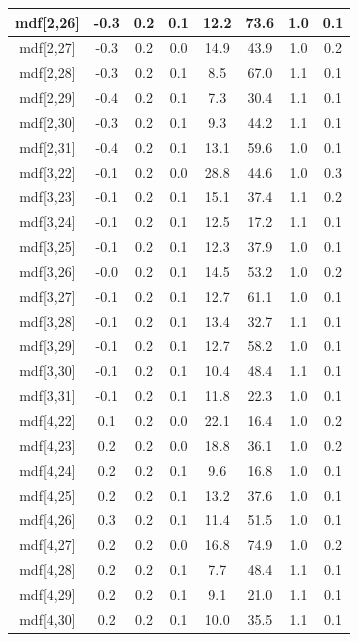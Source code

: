 \begin{longtable}{|c|c|c|c|c|c|c|c|}
\hline
mdf[2,26] & -0.3 & 0.2 & 0.1 & 12.2 & 73.6 & 1.0 & 0.1 \\
\hline
mdf[2,27] & -0.3 & 0.2 & 0.0 & 14.9 & 43.9 & 1.0 & 0.2 \\
\hline
mdf[2,28] & -0.3 & 0.2 & 0.1 & 8.5 & 67.0 & 1.1 & 0.1 \\
\hline
mdf[2,29] & -0.4 & 0.2 & 0.1 & 7.3 & 30.4 & 1.1 & 0.1 \\
\hline
mdf[2,30] & -0.3 & 0.2 & 0.1 & 9.3 & 44.2 & 1.1 & 0.1 \\
\hline
mdf[2,31] & -0.4 & 0.2 & 0.1 & 13.1 & 59.6 & 1.0 & 0.1 \\
\hline
mdf[3,22] & -0.1 & 0.2 & 0.0 & 28.8 & 44.6 & 1.0 & 0.3 \\
\hline
mdf[3,23] & -0.1 & 0.2 & 0.1 & 15.1 & 37.4 & 1.1 & 0.2 \\
\hline
mdf[3,24] & -0.1 & 0.2 & 0.1 & 12.5 & 17.2 & 1.1 & 0.1 \\
\hline
mdf[3,25] & -0.1 & 0.2 & 0.1 & 12.3 & 37.9 & 1.0 & 0.1 \\
\hline
mdf[3,26] & -0.0 & 0.2 & 0.1 & 14.5 & 53.2 & 1.0 & 0.2 \\
\hline
mdf[3,27] & -0.1 & 0.2 & 0.1 & 12.7 & 61.1 & 1.0 & 0.1 \\
\hline
mdf[3,28] & -0.1 & 0.2 & 0.1 & 13.4 & 32.7 & 1.1 & 0.1 \\
\hline
mdf[3,29] & -0.1 & 0.2 & 0.1 & 12.7 & 58.2 & 1.0 & 0.1 \\
\hline
mdf[3,30] & -0.1 & 0.2 & 0.1 & 10.4 & 48.4 & 1.1 & 0.1 \\
\hline
mdf[3,31] & -0.1 & 0.2 & 0.1 & 11.8 & 22.3 & 1.0 & 0.1 \\
\hline
mdf[4,22] & 0.1 & 0.2 & 0.0 & 22.1 & 16.4 & 1.0 & 0.2 \\
\hline
mdf[4,23] & 0.2 & 0.2 & 0.0 & 18.8 & 36.1 & 1.0 & 0.2 \\
\hline
mdf[4,24] & 0.2 & 0.2 & 0.1 & 9.6 & 16.8 & 1.0 & 0.1 \\
\hline
mdf[4,25] & 0.2 & 0.2 & 0.1 & 13.2 & 37.6 & 1.0 & 0.1 \\
\hline
mdf[4,26] & 0.3 & 0.2 & 0.1 & 11.4 & 51.5 & 1.0 & 0.1 \\
\hline
mdf[4,27] & 0.2 & 0.2 & 0.0 & 16.8 & 74.9 & 1.0 & 0.2 \\
\hline
mdf[4,28] & 0.2 & 0.2 & 0.1 & 7.7 & 48.4 & 1.1 & 0.1 \\
\hline
mdf[4,29] & 0.2 & 0.2 & 0.1 & 9.1 & 21.0 & 1.1 & 0.1 \\
\hline
mdf[4,30] & 0.2 & 0.2 & 0.1 & 10.0 & 35.5 & 1.1 & 0.1 \\

\end{longtable}
